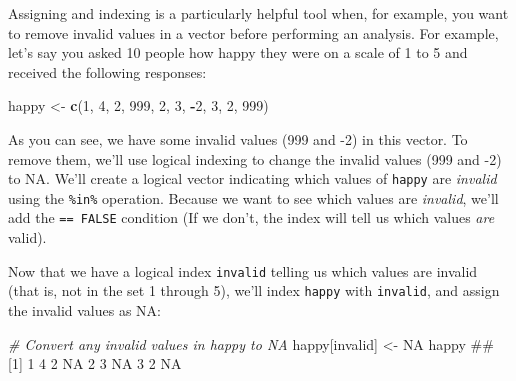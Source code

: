 \documentclass[]{book}
\newenvironment{Shaded}{\begin{snugshade}}{\end{snugshade}}
\newcommand{\KeywordTok}[1]{\textcolor[rgb]{0.13,0.29,0.53}{\textbf{#1}}}
\newcommand{\DecValTok}[1]{\textcolor[rgb]{0.00,0.00,0.81}{#1}}
\newcommand{\StringTok}[1]{\textcolor[rgb]{0.31,0.60,0.02}{#1}}
\newcommand{\CommentTok}[1]{\textcolor[rgb]{0.56,0.35,0.01}{\textit{#1}}}
\newcommand{\OtherTok}[1]{\textcolor[rgb]{0.56,0.35,0.01}{#1}}
\newcommand{\OperatorTok}[1]{\textcolor[rgb]{0.81,0.36,0.00}{\textbf{#1}}}
\newcommand{\NormalTok}[1]{#1}
\theoremstyle{definition}
\theoremstyle{definition}
\theoremstyle{remark}
\begin{document}
Assigning and indexing is a particularly helpful tool when, for example,
you want to remove invalid values in a vector before performing an
analysis. For example, let's say you asked 10 people how happy they were
on a scale of 1 to 5 and received the following responses:

\begin{Shaded}
\begin{Highlighting}[]
\NormalTok{happy <-}\StringTok{ }\KeywordTok{c}\NormalTok{(}\DecValTok{1}\NormalTok{, }\DecValTok{4}\NormalTok{, }\DecValTok{2}\NormalTok{, }\DecValTok{999}\NormalTok{, }\DecValTok{2}\NormalTok{, }\DecValTok{3}\NormalTok{, }\OperatorTok{-}\DecValTok{2}\NormalTok{, }\DecValTok{3}\NormalTok{, }\DecValTok{2}\NormalTok{, }\DecValTok{999}\NormalTok{)}
\end{Highlighting}
\end{Shaded}

As you can see, we have some invalid values (999 and -2) in this vector.
To remove them, we'll use logical indexing to change the invalid values
(999 and -2) to NA. We'll create a logical vector indicating which
values of \texttt{happy} are \emph{invalid} using the \texttt{\%in\%}
operation. Because we want to see which values are \emph{invalid}, we'll
add the \texttt{==\ FALSE} condition (If we don't, the index will tell
us which values \emph{are} valid).

\begin{Shaded}
\end{Shaded}

Now that we have a logical index \texttt{invalid} telling us which
values are invalid (that is, not in the set 1 through 5), we'll index
\texttt{happy} with \texttt{invalid}, and assign the invalid values as
NA:

\begin{Shaded}
\begin{Highlighting}[]
\CommentTok{# Convert any invalid values in happy to NA}
\NormalTok{happy[invalid] <-}\StringTok{ }\OtherTok{NA}
\NormalTok{happy}
\NormalTok{##  [1]  1  4  2 NA  2  3 NA  3  2 NA}
\end{Highlighting}
\end{Shaded}
\end{document}
